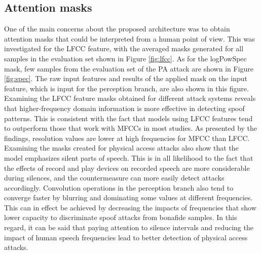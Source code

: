 \documentclass[a4paper]{article}
\begin{document}
\subsection{Attention masks}
One of the main concerns about the proposed architecture was to obtain attention masks that could be interpreted from a human point of view. This was investigated for the LFCC feature, with the averaged masks generated for all samples in the evaluation set shown in Figure \ref{fig:lfcc}. As for the logPowSpec mask, few samples from the evaluation set of the PA attack are shown in Figure \ref{fig:spec}. The raw input features and results of the applied mask on the input feature, which is input for the perception branch, are also shown in this figure.
Examining the LFCC feature masks obtained for different attack systems reveals that higher-frequency domain information is more effective in detecting spoof patterns. This is consistent with the fact that models using LFCC features tend to outperform those that work with MFCCs in most studies. As presented by the findings, resolution values are lower at high frequencies for MFCC than LFCC. Examining the masks created for physical access attacks also show that the model emphasizes silent parts of speech. This is in all likelihood to the fact that the effects of record and play devices on recorded speech are more considerable during silences, and the countermeasure can more easily detect attacks accordingly. Convolution operations in the perception branch also tend to converge faster by blurring and dominating some values at different frequencies. This can in effect be achieved by decreasing the impacts of frequencies that show lower capacity to discriminate spoof attacks from bonafide samples. In this regard, it can be said that paying attention to silence intervals and reducing the impact of human speech frequencies lead to better detection of physical access attacks.
\end{document}
